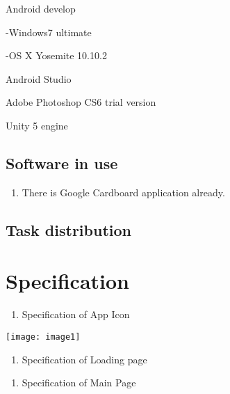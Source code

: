 \documentclass{article}
\begin{document}
\noindent 

\noindent Android develop

\noindent -Windows7 ultimate

\noindent -OS X Yosemite 10.10.2

\noindent 

\noindent Android Studio

\noindent 

\noindent Adobe Photoshop CS6 trial version

\noindent 

\noindent Unity 5 engine


\subsection{ Software in use}

\begin{enumerate}
\item  There is Google Cardboard application already.
\end{enumerate}


\subsection{ Task distribution}


\section{ Specification}

\noindent 

\begin{enumerate}
\item  Specification of App Icon
\end{enumerate}

\noindent \texttt{[image: image1]}

\begin{enumerate}
\item  Specification of Loading page
\end{enumerate}

\noindent 

\begin{enumerate}
\item  Specification of Main Page
\end{enumerate}

\noindent 

\noindent 
\end{document}
